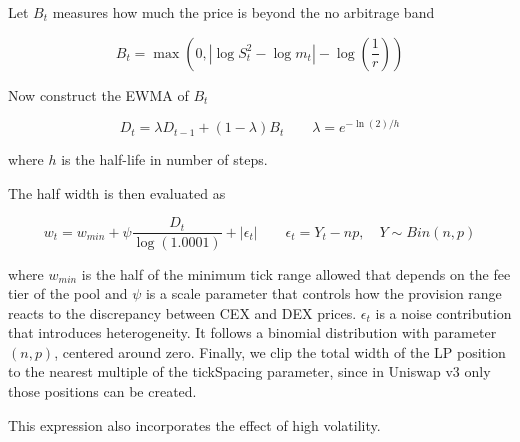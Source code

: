 \documentclass[a4paper,11pt]{article}
\begin{document}
Let $B_t$ measures how much the price is beyond the no arbitrage band

\begin{equation}
    B_t = \max{\left(0, |\log S_t^2 - \log m_t| - \log \left(\frac{1}{r}\right)\right)}
\end{equation}

Now construct the EWMA of $B_t$

\begin{equation}
    D_t = \lambda D_{t-1} + (1-\lambda)B_t \qquad \lambda=e^{-\ln(2)/h}
\end{equation}

where $h$ is the half-life in number of steps.

The half width is then evaluated as

\begin{equation}
    w_t = w_{min} + \psi \frac{D_t}{\log(1.0001)} + |\epsilon_t| \qquad \epsilon_t=Y_t-np, \quad Y \sim Bin(n,p)
\end{equation}


where $w_{min}$ is the half of the minimum tick range allowed that depends on the fee tier of the pool and $\psi$ is a scale parameter that controls how the provision range reacts to the discrepancy between CEX and DEX prices. $\epsilon_t$ is a noise contribution that introduces heterogeneity. It follows a binomial distribution with parameter $(n,p)$, centered around zero. Finally, we clip the total width of the LP position to the nearest multiple of the tickSpacing parameter, since in Uniswap v3 only those positions can be created.


This expression also incorporates the effect of high volatility. 
\end{document}
